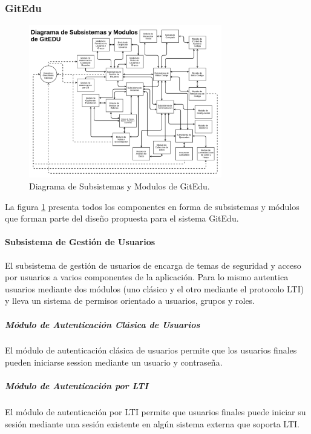 \subsubsection{GitEdu}

\begin{figure}
  \begin{center}
    \includegraphics[width=0.75\textwidth]{Figures/mod_ge.png}
  \end{center}
  \caption{Diagrama de Subsistemas y Modulos de GitEdu.}
  \label{mod_ge}
\end{figure}

La figura \ref{mod_ge} presenta todos los componentes en forma de subsistemas y módulos que forman parte del diseño propuesta para el sistema GitEdu.

\paragraph{Subsistema de Gestión de Usuarios}
El subsistema de gestión de usuarios de encarga de temas de seguridad y acceso por usuarios a varios componentes de la aplicación. Para lo mismo autentica usuarios mediante dos módulos (uno clásico y el otro mediante el protocolo LTI) y lleva un sistema de permisos orientado a usuarios, grupos y roles.

\subparagraph{Módulo de Autenticación Clásica de Usuarios}
El módulo de autenticación clásica de usuarios permite que los usuarios finales pueden iniciarse session mediante un usuario y contraseña.

\subparagraph{Módulo de Autenticación por LTI}
El módulo de autenticación por LTI permite que usuarios finales puede iniciar su sesión mediante una sesión existente en algún sistema externa que soporta LTI.

